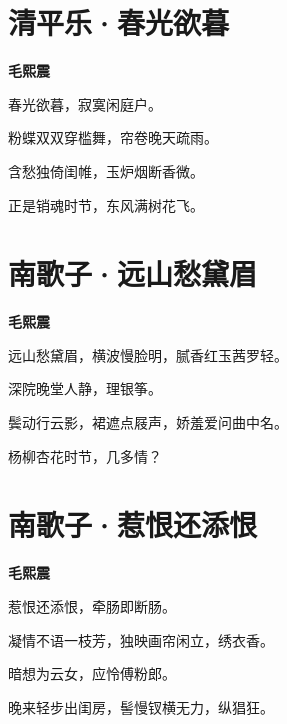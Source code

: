 \documentclass[12pt,a4paper]{ctexbook}
\begin{document}
\section{清平乐·春光欲暮}
\textbf{毛熙震}\par\vspace{0.5em}
春光欲暮，寂寞闲庭户。\par
粉蝶双双穿槛舞，帘卷晚天疏雨。\par
含愁独倚闺帷，玉炉烟断香微。\par
正是销魂时节，东风满树花飞。\par

\section{南歌子·远山愁黛眉}
\textbf{毛熙震}\par\vspace{0.5em}
远山愁黛眉，横波慢脸明，腻香红玉茜罗轻。\par
深院晚堂人静，理银筝。\par
鬓动行云影，裙遮点屐声，娇羞爱问曲中名。\par
杨柳杏花时节，几多情？\par

\section{南歌子·惹恨还添恨}
\textbf{毛熙震}\par\vspace{0.5em}
惹恨还添恨，牵肠即断肠。\par
凝情不语一枝芳，独映画帘闲立，绣衣香。\par
暗想为云女，应怜傅粉郎。\par
晚来轻步出闺房，髻慢钗横无力，纵猖狂。\par
\end{document}
